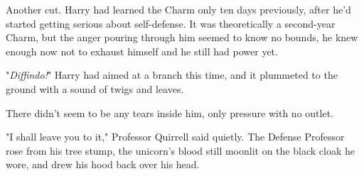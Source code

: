 Another cut. Harry had learned the Charm only ten days previously, after he'd
started getting serious about self-defense. It was theoretically a second-year
Charm, but the anger pouring through him seemed to know no bounds, he knew
enough now not to exhaust himself and he still had power yet.

"\emph{Diffindo!}" Harry had aimed at a branch this time, and it plummeted to
the ground with a sound of twigs and leaves.

There didn't seem to be any tears inside him, only pressure with no outlet.

"I shall leave you to it," Professor Quirrell said quietly. The Defense
Professor rose from his tree stump, the unicorn's blood still moonlit on the
black cloak he wore, and drew his hood back over his head.
